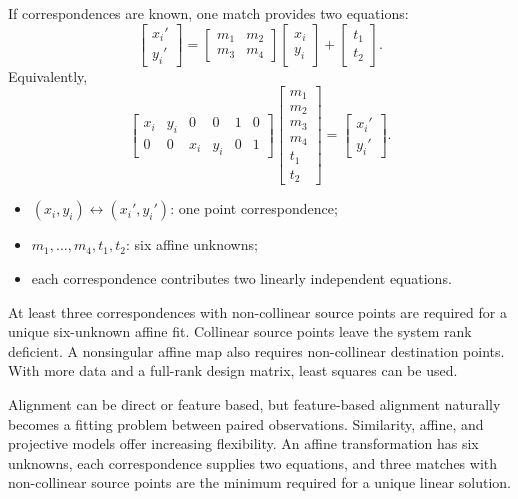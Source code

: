 \documentclass[11pt,a4paper,oneside]{report}
\newcommand{\mathlegend}[1]{%
  \par\vspace{0.2em}{\small\itshape where}\par
  \begin{itemize}[leftmargin=1.7em,topsep=0.15em,itemsep=0.12em]
  #1
  \end{itemize}
}
\begin{document}
If correspondences are known, one match provides two equations:
\begin{equation}
  \begin{bmatrix}x_i'\\y_i'\end{bmatrix}
  =
  \begin{bmatrix}m_1&m_2\\m_3&m_4\end{bmatrix}
  \begin{bmatrix}x_i\\y_i\end{bmatrix}
  +\begin{bmatrix}t_1\\t_2\end{bmatrix}.
  \label{eq:affine-match}
\end{equation}
Equivalently,
\begin{equation}
\begin{bmatrix}
x_i&y_i&0&0&1&0\\
0&0&x_i&y_i&0&1
\end{bmatrix}
\begin{bmatrix}m_1\\m_2\\m_3\\m_4\\t_1\\t_2\end{bmatrix}
=
\begin{bmatrix}x_i'\\y_i'\end{bmatrix}.
\label{eq:affine-linear-system}
\end{equation}
\mathlegend{
  \item $(x_i,y_i)\leftrightarrow(x_i',y_i')$: one point correspondence;
  \item $m_1,\ldots,m_4,t_1,t_2$: six affine unknowns;
  \item each correspondence contributes two linearly independent equations.
}
At least three correspondences with non-collinear source points are required for a unique six-unknown affine fit. Collinear source points leave the system rank deficient. A nonsingular affine map also requires non-collinear destination points. With more data and a full-rank design matrix, least squares can be used.

\begin{chaptersummary}
Alignment can be direct or feature based, but feature-based alignment naturally becomes a fitting problem between paired observations. Similarity, affine, and projective models offer increasing flexibility. An affine transformation has six unknowns, each correspondence supplies two equations, and three matches with non-collinear source points are the minimum required for a unique linear solution.
\end{chaptersummary}
\end{document}
